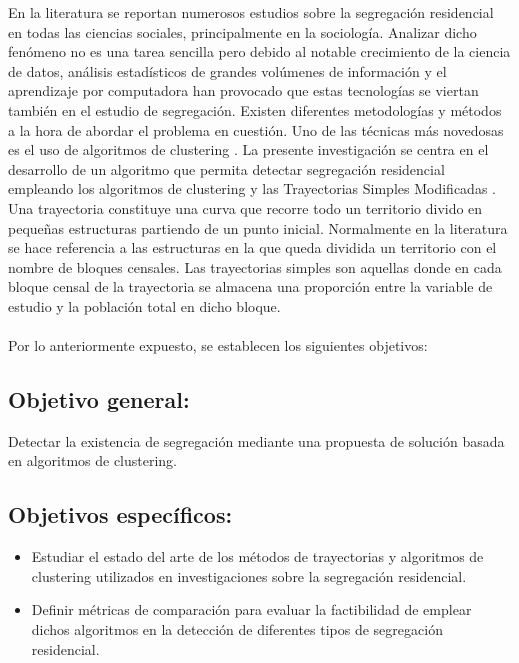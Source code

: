 En la literatura se reportan numerosos estudios sobre la segregación residencial en todas las ciencias sociales, principalmente en la sociología. Analizar dicho fenómeno no es una tarea sencilla pero debido al notable crecimiento de la ciencia de datos, análisis estadísticos de grandes volúmenes de información y el aprendizaje por computadora han provocado que estas tecnologías se viertan también en el estudio de segregación. Existen diferentes metodologías y métodos a la hora de abordar el problema en cuestión. Uno de las técnicas más novedosas es el uso de algoritmos de clustering \cite{Morissette2013TheKC}. La presente investigación se centra en el desarrollo de un algoritmo que permita detectar segregación residencial empleando los algoritmos de clustering y las Trayectorias Simples Modificadas \cite{RandonFurling2018FromUS}. Una trayectoria constituye una curva que recorre todo un territorio divido en pequeñas estructuras partiendo de un punto inicial. Normalmente en la literatura se hace referencia a las estructuras en la que queda dividida un territorio con el nombre de bloques censales. Las trayectorias simples son aquellas donde en cada bloque censal de la trayectoria se almacena una proporción entre la variable de estudio y la población total en dicho bloque.\\\\


Por lo anteriormente expuesto, se establecen los siguientes objetivos:


\subsection*{Objetivo general:}
Detectar la existencia de segregación mediante una propuesta de solución basada en algoritmos de clustering.
\subsection*{Objetivos específicos:}
\begin{itemize}
	
	\item Estudiar el estado del arte de los métodos de trayectorias y algoritmos de clustering utilizados en investigaciones sobre la segregación residencial.
	
	\item Definir métricas de comparación para evaluar la factibilidad de emplear dichos algoritmos en la detección de diferentes tipos de segregación residencial.
	

	
\end{itemize}



